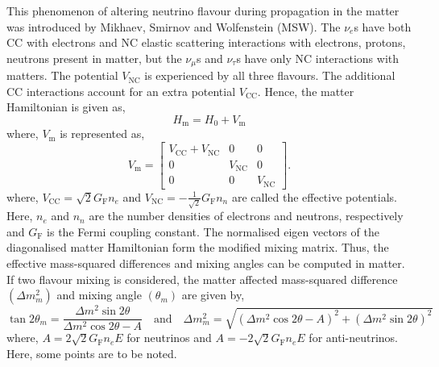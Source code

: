 This phenomenon of altering neutrino flavour during propagation in the
matter was introduced by Mikhaev, Smirnov and Wolfenstein
(MSW)\cite{msw1}. The $\nu_{e}$s have both CC with electrons and NC elastic 
scattering interactions with electrons, protons, neutrons present in matter, 
but the $\nu_{\mu}$s and
$\nu_{\tau}$s have only NC interactions with matters. The potential
$V_{\textrm{NC}}$ is experienced by all three flavours. The additional
CC interactions account for an extra potential $V_{\textrm{CC}}$. Hence, the
matter Hamiltonian is given as,
\begin{equation}
  H_{\mathrm{m}} = H_{0}+V_{\mathrm{m}}
\end{equation}
where, $V_{\mathrm{m}}$ is represented as,
\begin{equation}
  V_{\mathrm{m}} =
  \begin{bmatrix}
    V_{\textrm{CC}} + V_{\textrm{NC}} & 0 & 0 \\
    0 & V_{\textrm{NC}} & 0 \\
    0 & 0 & V_{\textrm{NC}}
  \end{bmatrix}.
\end{equation}
where, $V_{\textrm{CC}} = \sqrt{2}G_{\mathrm{F}}n_{e}$ and
$V_{\textrm{NC}} = -\frac{1}{\sqrt{2}}G_{\mathrm{F}}n_{n}$ are called the effective
potentials. Here, $n_{e}$ and $n_{n}$ are the number densities of electrons and
neutrons, respectively and $G_{\mathrm{F}}$ is the Fermi coupling
constant.
The normalised eigen vectors of the diagonalised matter Hamiltonian form the
modified mixing matrix. Thus, the effective mass-squared differences and mixing
angles can be computed in matter. If two flavour mixing is considered, the
matter affected mass-squared difference $\left(\Delta m^{2}_{m}\right)$ and
mixing angle $\left(\theta_{m}\right)$ are given by,
\begin{equation}
  \tan 2\theta_{m}=\frac{\Delta m^{2}\sin 2\theta}{\Delta m^{2}\cos 2\theta -A} \quad\text{and}\quad \Delta m^{2}_{m} = \sqrt{\left(\Delta m^{2}\cos 2\theta -A\right)^{2} + \left(\Delta m^{2}\sin 2\theta\right)^{2}} \label{eq:mattermass}
\end{equation}
where, $A=2\sqrt{2}G_{\mathrm{F}}n_{e}E$ for neutrinos and
$A=-2\sqrt{2}G_{\mathrm{F}}n_{e}E$ for anti-neutrinos. Here, some points are to
be noted.
